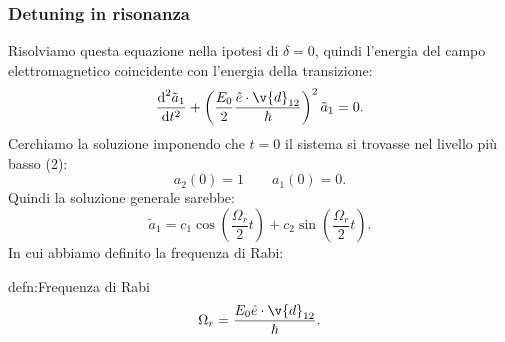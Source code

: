 \subsubsection{Detuning in risonanza}%
Risolviamo questa equazione nella ipotesi di $\delta =0$, quindi l'energia del campo elettromagnetico coincidente con l'energia della transizione:
\[
    \frac{\text{d}^2 \tilde{a}_1}{\text{d} t^2} 
    + \left(\frac{E_0}{2}\frac{\hat{e}\cdot \v{d}_{12}}{\hbar }\right)^2
    \tilde{a}_1=0
.\] 
Cerchiamo la soluzione imponendo che $t=0$ il sistema si trovasse nel livello più basso (2): 
\[
    a_2(0) = 1 \qquad
    a_1(0) = 0
.\] 
Quindi la soluzione generale sarebbe:
\[
    \tilde{a}_1 = c_1 \cos\left(\frac{\Omega_r}{2}t\right) 
    + c_2 \sin\left(\frac{\Omega_r}{2}t\right)
.\] 
In cui abbiamo definito la frequenza di Rabi:
\begin{defn}{defn:Frequenza di Rabi}
\[
  \Omega_r = \frac{E_0 \hat{e}\cdot \v{d}_{12}}{\hbar }  
.\] 
\end{defn}

